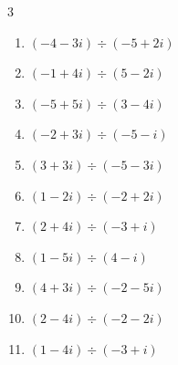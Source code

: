 \begin{multicols}{3}
\begin{enumerate}

  \item $\displaystyle (-4-3i)\div(-5+2i)$


  \item $\displaystyle (-1+4i)\div(5-2i)$


  \item $\displaystyle (-5+5i)\div(3-4i)$


  \item $\displaystyle (-2+3i)\div(-5-i)$


\columnbreak %

  \item $\displaystyle (3+3i)\div(-5-3i)$


  \item $\displaystyle (1-2i)\div(-2+2i)$


  \item $\displaystyle (2+4i)\div(-3+i)$


  \item $\displaystyle (1-5i)\div(4-i)$


  \item $\displaystyle (4+3i)\div(-2-5i)$


  \item $\displaystyle (2-4i)\div(-2-2i)$


  \item $\displaystyle (1-4i)\div(-3+i)$



\end{enumerate}
\end{multicols}
